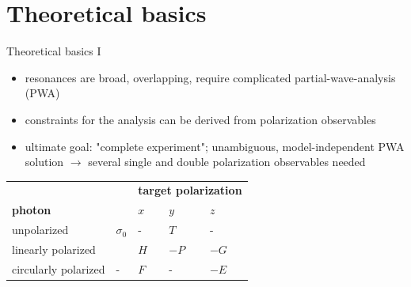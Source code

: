 \documentclass[11pt,aspectratio=169,dvipsnames]{beamer}
\newcommand{\thecolor}{black!70!blue}
\begin{document}
	\begin{frame}
		\setcounter{tocdepth}{2}
		\tableofcontents
	\end{frame}
\section{Theoretical basics}
	\begin{frame}{Theoretical basics I}
		\begin{itemize}
			\item resonances are broad, overlapping, require complicated partial-wave-analysis (PWA)
			\item constraints for the analysis can be derived from polarization observables
			\item ultimate goal: "complete experiment"; unambiguous, model-independent PWA solution $\to$ several single and double polarization observables needed
		\end{itemize}
		\begin{tcolorbox}[colback=blue!5,colframe=\thecolor,title = Beam-target polarization observables]
			\centering
			\begin{tabularx}{.7\linewidth}{|l|l|X|X|X|}
				\hline
				\multicolumn{2}{|c}{}&\multicolumn{3}{c|}{\textbf{target polarization}}\\
				\textbf{photon} & &$x$&$y$&$z$\\
				\hline
				unpolarized & $\sigma_0$&-&$T$&-\\
				linearly polarized &\color{red}{$-\Sigma$}&$H$&$-P$&$-G$\\
				circularly polarized &-&$F$&-&$-E$\\
				\hline
			\end{tabularx}
			\begin{flushright}
				\cites{san}
			\end{flushright}
		\end{tcolorbox}	
	\end{frame}
	
	
	
\end{document}
